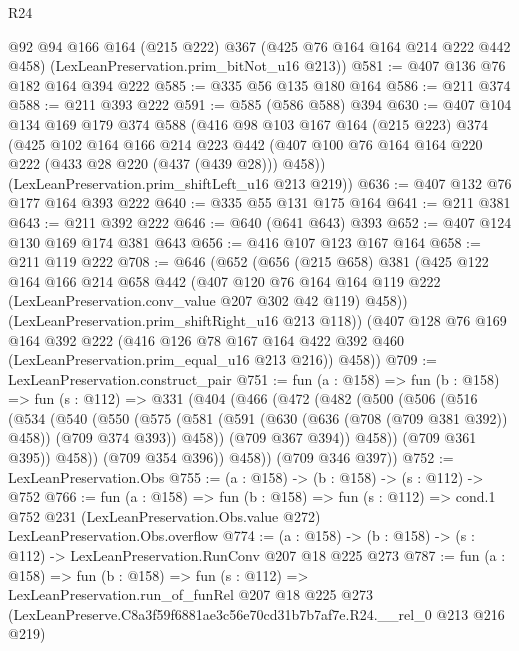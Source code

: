 \begin{lexlean}{R24}
\begin{coremodule}
      @92
      @94
      @166
      @164
      (@215 @222)
      @367
      (@425 @76 @164 @164 @214 @222 @442 @458)
      (LexLeanPreservation.prim_bitNot_u16 @213))
@581 := @407 @136 @76 @182 @164 @394 @222
@585 := @335 @56 @135 @180 @164
@586 := @211 @374
@588 := @211 @393 @222
@591 := @585 (@586 @588) @394
@630 := @407
    @104
    @134
    @169
    @179
    @374
    @588
    (@416
      @98
      @103
      @167
      @164
      (@215 @223)
      @374
      (@425
        @102
        @164
        @166
        @214
        @223
        @442
        (@407 @100 @76 @164 @164 @220 @222 (@433 @28 @220 (@437 (@439 @28))) @458))
      (LexLeanPreservation.prim_shiftLeft_u16 @213 @219))
@636 := @407 @132 @76 @177 @164 @393 @222
@640 := @335 @55 @131 @175 @164
@641 := @211 @381
@643 := @211 @392 @222
@646 := @640 (@641 @643) @393
@652 := @407 @124 @130 @169 @174 @381 @643
@656 := @416 @107 @123 @167 @164
@658 := @211 @119 @222
@708 := @646
    (@652
      (@656
        (@215 @658)
        @381
        (@425
          @122
          @164
          @166
          @214
          @658
          @442
          (@407
            @120
            @76
            @164
            @164
            @119
            @222
            (LexLeanPreservation.conv_value @207 @302 @42 @119)
            @458))
        (LexLeanPreservation.prim_shiftRight_u16 @213 @118))
      (@407
        @128
        @76
        @169
        @164
        @392
        @222
        (@416 @126 @78 @167 @164 @422 @392 @460 (LexLeanPreservation.prim_equal_u16 @213 @216))
        @458))
@709 := LexLeanPreservation.construct_pair
@751 := fun (a : @158) =>
  fun (b : @158) =>
  fun (s : @112) =>
  @331
    (@404
      (@466
        (@472
          (@482
            (@500
              (@506
                (@516
                  (@534
                    (@540
                      (@550
                        (@575
                          (@581
                            (@591 (@630 (@636 (@708 (@709 @381 @392)) @458)) (@709 @374 @393))
                            @458))
                        (@709 @367 @394))
                      @458))
                  (@709 @361 @395))
                @458))
            (@709 @354 @396))
          @458))
      (@709 @346 @397))
@752 := LexLeanPreservation.Obs
@755 := (a : @158) -> (b : @158) -> (s : @112) -> @752
@766 := fun (a : @158) =>
  fun (b : @158) =>
  fun (s : @112) =>
  cond.{1} @752 @231 (LexLeanPreservation.Obs.value @272) LexLeanPreservation.Obs.overflow
@774 := (a : @158) -> (b : @158) -> (s : @112) -> LexLeanPreservation.RunConv @207 @18 @225 @273
@787 := fun (a : @158) =>
  fun (b : @158) =>
  fun (s : @112) =>
  LexLeanPreservation.run_of_funRel
    @207
    @18
    @225
    @273
    (LexLeanPreserve.C8a3f59f6881ae3c56e70cd31b7b7af7e.R24.__rel_0 @213 @216 @219)
\end{coremodule}
\end{lexlean}
